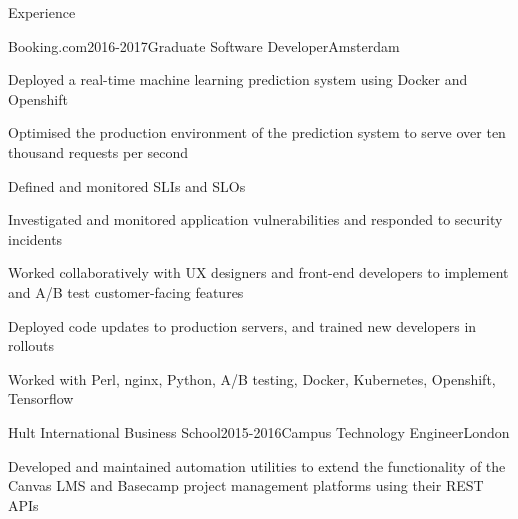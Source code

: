 \documentclass{resume} %
\begin{document}
\begin{rSection}{Experience}

\begin{rSubsection}{{Booking.com}}{2016-2017}{Graduate Software Developer}{Amsterdam}
    \item Deployed a real-time machine learning prediction system using Docker and Openshift
    \item Optimised the production environment of the prediction system to serve over ten thousand requests per second
    \item Defined and monitored SLIs and SLOs
    \item Investigated and monitored application vulnerabilities and responded to security incidents
    \item Worked collaboratively with UX designers and front-end developers to implement and A/B test customer-facing features
    \item Deployed code updates to production servers, and trained new developers in rollouts
    \item Worked with Perl, nginx, Python, A/B testing, Docker, Kubernetes, Openshift, Tensorflow
\end{rSubsection}

\begin{rSubsection}{{Hult International Business School}}{2015-2016}{Campus Technology Engineer}{London}
    \item Developed and maintained automation utilities to extend the functionality of the Canvas LMS and Basecamp project management platforms using their REST APIs
\end{rSubsection}

\end{rSection}

\newpage

\end{document}
